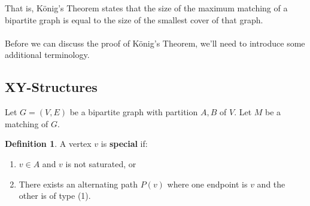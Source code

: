\documentclass[]{article}
\theoremstyle{definition}
\newtheorem*{defn}{Definition}
\begin{document}
			That is, K\"onig's Theorem states that the size of the maximum matching of a bipartite graph is equal to the size of the smallest cover of that graph.
			\\ \\
			Before we can discuss the proof of K\"onig's Theorem, we'll need to introduce some additional terminology.
			
		\subsection{XY-Structures}
			Let $G = (V, E)$ be a bipartite graph with partition $A, B$ of $V$. Let $M$ be a matching of $G$.
			
			\begin{defn}
				A vertex $v$ is \textbf{special} if:
				\begin{enumerate}
					\item $v \in A$ and $v$ is not saturated, or
					\item There exists an alternating path $P(v)$ where one endpoint is $v$ and the other is of type (1).
				\end{enumerate}
			\end{defn}
			
	\newpage
\end{document}
